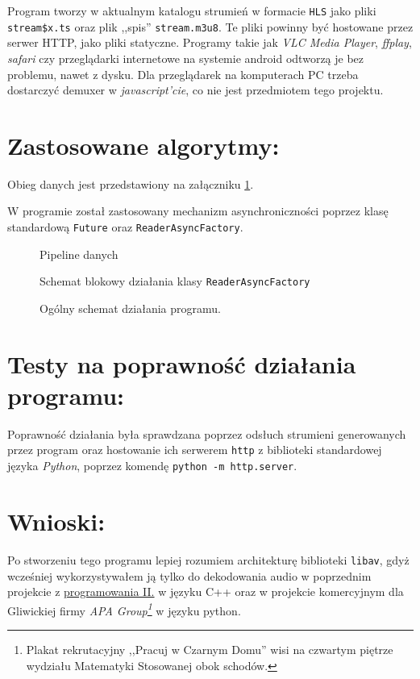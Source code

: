 \documentclass[a4paper,12pt]{article}
\begin{document}
Program tworzy w aktualnym katalogu strumień w formacie \texttt{HLS} jako pliki
\texttt{stream\$x.ts} oraz plik ,,spis'' \texttt{stream.m3u8}. Te pliki powinny
być hostowane przez serwer HTTP, jako pliki statyczne. Programy takie jak
\emph{VLC Media Player}, \emph{ffplay}, \emph{safari} czy przeglądarki
internetowe na systemie android odtworzą je bez problemu, nawet z dysku. Dla
przeglądarek na komputerach PC trzeba dostarczyć demuxer w
\emph{javascript'cie}, co nie jest przedmiotem tego projektu.


\section{Zastosowane algorytmy:}

Obieg danych jest przedstawiony na załączniku \ref{rys:pipeline}.

W programie został zastosowany mechanizm asynchroniczności poprzez klasę
standardową \texttt{Future} oraz \texttt{ReaderAsyncFactory}.

\begin{figure}[p]
    \resizebox{.3\textwidth}{!}{%
    }
    \centering
    \caption{Pipeline danych}
    \label{rys:pipeline}
\end{figure}

\begin{figure}[p]
    \resizebox{.7\textwidth}{!}{%
    }
    \centering
    \caption{Schemat blokowy działania klasy \texttt{ReaderAsyncFactory}}
    \label{rys:reader}
\end{figure}

\begin{figure}[p]
    \resizebox{.8\textwidth}{!}{%
    }
    \centering
    \caption{Ogólny schemat działania programu.}
    \label{rys:program}
\end{figure}

\section{Testy na poprawność działania programu:}

Poprawność działania była sprawdzana poprzez odsłuch strumieni generowanych
przez program oraz hostowanie ich serwerem \texttt{http} z biblioteki
standardowej języka \emph{Python}, poprzez komendę \texttt{python -m
http.server}.

\section{Wnioski:}

Po stworzeniu tego programu lepiej rozumiem architekturę biblioteki
\texttt{libav}, gdyż wcześniej wykorzystywałem ją tylko do dekodowania audio w
poprzednim projekcie z
\href{https://github.com/HakierGrzonzo/GrzesSFMLlib}{programowania II.} w języku
C++ oraz w projekcie komercyjnym dla Gliwickiej firmy \emph{APA
Group\footnote{Plakat rekrutacyjny ,,Pracuj w Czarnym Domu'' wisi na czwartym
piętrze wydziału Matematyki Stosowanej obok schodów.}} w języku
python.
\end{document}
